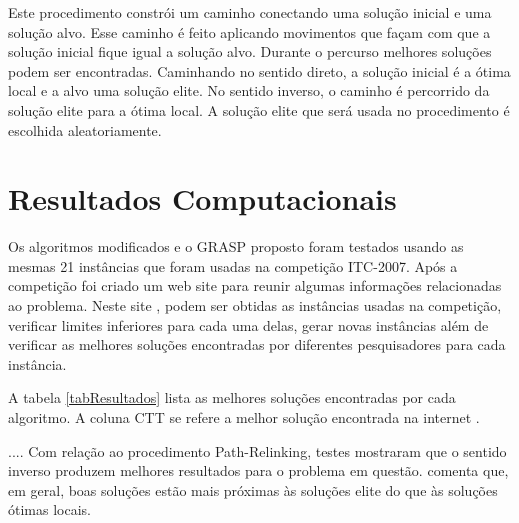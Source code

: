 \documentclass[11pt]{article}
\begin{document}
Este procedimento constrói um caminho conectando uma solução inicial e uma solução alvo. Esse caminho é feito aplicando movimentos que façam com que a solução inicial fique igual a solução alvo. Durante o percurso melhores soluções podem ser encontradas. Caminhando no sentido direto, a solução inicial é a ótima local e a alvo uma solução elite. No sentido inverso, o caminho é percorrido da solução elite para a ótima local. A solução elite que será usada no procedimento é escolhida aleatoriamente.

\section{Resultados Computacionais}
\label{sec:resultados}

Os algoritmos modificados e o GRASP proposto foram testados usando as mesmas 21 instâncias que foram usadas na competição ITC-2007. Após a competição foi criado um web site para reunir algumas informações relacionadas ao problema. Neste site \cite{ctt}, podem ser obtidas as instâncias usadas na competição, verificar limites inferiores para cada uma delas, gerar novas instâncias além de verificar as melhores soluções encontradas por diferentes pesquisadores para cada instância.

A tabela \ref{tabResultados} lista as melhores soluções encontradas por cada algoritmo. A coluna CTT se refere a melhor solução encontrada na internet \cite{ctt}.

.... Com relação ao procedimento Path-Relinking, testes mostraram que o sentido inverso produzem melhores resultados para o problema em questão. \cite{grasp_resende_ribeiro} comenta que, em geral, boas soluções estão mais próximas às soluções elite do que às soluções ótimas locais.
\end{document}
